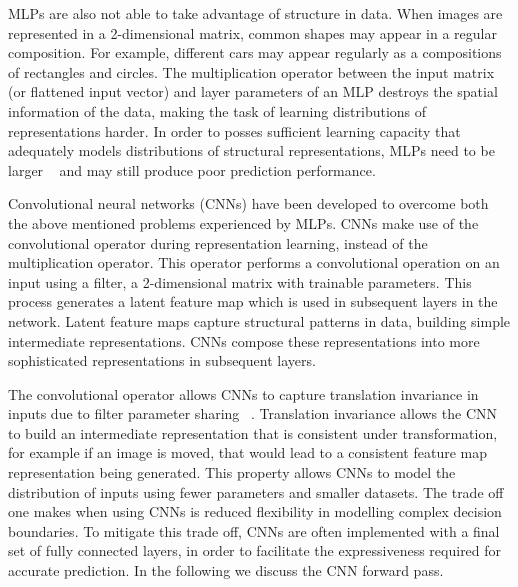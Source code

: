 \noindent MLPs are also not able to take advantage of structure in data. When images are represented in a 2-dimensional matrix, common shapes may appear in a regular composition. For example, different cars may appear regularly as a compositions of rectangles and circles. The multiplication operator between the input matrix (or flattened input vector) and layer parameters of an MLP destroys the spatial information of the data, making the task of learning distributions of representations harder. In order to posses sufficient learning capacity that adequately models distributions of structural representations, MLPs need to be larger \unskip ~\citep{lecun1998gradient} and may still produce poor prediction performance. \par

\noindent Convolutional neural networks (CNNs) have been developed to overcome both the above mentioned problems experienced by MLPs. CNNs make use of the convolutional operator during representation learning, instead of the multiplication operator. This operator performs a convolutional operation on an input using a filter, a 2-dimensional matrix with trainable parameters. This process generates a latent feature map which is used in subsequent layers in the network. Latent feature maps capture structural patterns in data, building simple intermediate representations. CNNs compose these representations into more sophisticated representations in subsequent layers. \par 

\noindent The convolutional operator allows CNNs to capture translation invariance in inputs due to filter parameter sharing \unskip ~\citep{simonyan2014very}. Translation invariance allows the CNN to build an intermediate representation that is consistent under transformation, for example if an image is moved, that would lead to a consistent feature map representation being generated. This property allows CNNs to model the distribution of inputs using fewer parameters and smaller datasets. The trade off one makes when using CNNs is reduced flexibility in modelling complex decision boundaries. To mitigate this trade off, CNNs are often implemented with a final set of fully connected layers, in order to facilitate the expressiveness required for accurate prediction. In the following we discuss the CNN forward pass. \par

